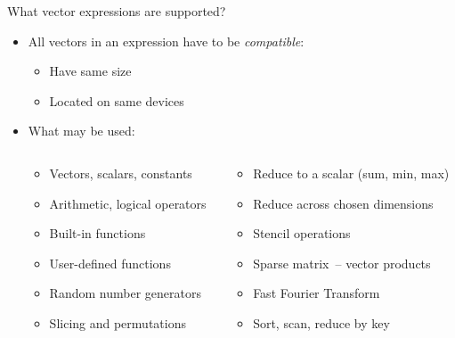 \documentclass[@BEAMER_OPTIONS@]{beamer}
\begin{document}
\begin{frame}[fragile]{What vector expressions are supported?}
    \begin{itemize}
        \item All vectors in an expression have to be \emph{compatible}:
            \begin{itemize}
                \item Have same size
                \item Located on same devices
            \end{itemize}
        \item What may be used:
            \begin{columns}
                \begin{column}{0.4\textwidth}
                    \begin{itemize}
                        \item Vectors, scalars, constants
                        \item Arithmetic, logical operators
                        \item Built-in functions
                        \item User-defined functions
                        \item Random number generators
                        \item Slicing and permutations
                    \end{itemize}
                \end{column}
                \begin{column}{0.42\textwidth}
                    \begin{itemize}
                        \item Reduce to a scalar (sum, min, max)
                        \item Reduce across chosen dimensions
                        \item Stencil operations
                        \item Sparse matrix~-- vector products
                        \item Fast Fourier Transform
                        \item Sort, scan, reduce by key
                    \end{itemize}
                \end{column}
            \end{columns}
    \end{itemize}
\end{frame}
\end{document}

